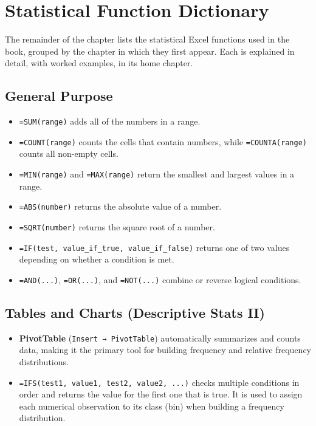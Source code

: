 \documentclass[
  11pt,
  letterpaper,
  DIV=11,
  numbers=noendperiod,
  oneside,
  open=any]{scrreprt}
\begin{document}
\section{Statistical Function
Dictionary}\label{statistical-function-dictionary}

The remainder of the chapter lists the statistical Excel functions used
in the book, grouped by the chapter in which they first appear. Each is
explained in detail, with worked examples, in its home chapter.

\subsection*{General Purpose}\label{general-purpose}

\begin{itemize}
\item
  \texttt{=SUM(range)} adds all of the numbers in a range.
\item
  \texttt{=COUNT(range)} counts the cells that contain numbers, while
  \texttt{=COUNTA(range)} counts all non-empty cells.
\item
  \texttt{=MIN(range)} and \texttt{=MAX(range)} return the smallest and
  largest values in a range.
\item
  \texttt{=ABS(number)} returns the absolute value of a number.
\item
  \texttt{=SQRT(number)} returns the square root of a number.
\item
  \texttt{=IF(test,\ value\_if\_true,\ value\_if\_false)} returns one of
  two values depending on whether a condition is met.
\item
  \texttt{=AND(...)}, \texttt{=OR(...)}, and \texttt{=NOT(...)} combine
  or reverse logical conditions.
\end{itemize}

\subsection*{Tables and Charts (Descriptive Stats
II)}\label{tables-and-charts-descriptive-stats-ii}

\begin{itemize}
\item
  \textbf{PivotTable} (\texttt{Insert\ →\ PivotTable}) automatically
  summarizes and counts data, making it the primary tool for building
  frequency and relative frequency distributions.
\item
  \texttt{=IFS(test1,\ value1,\ test2,\ value2,\ ...)} checks multiple
  conditions in order and returns the value for the first one that is
  true. It is used to assign each numerical observation to its class
  (bin) when building a frequency distribution.
\end{itemize}
\end{document}
